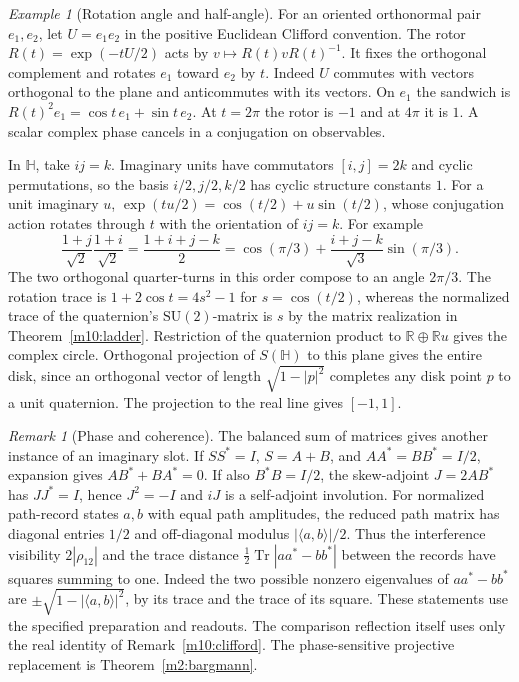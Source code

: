 \documentclass[11pt,reqno]{amsart}
\theoremstyle{definition}
\theoremstyle{remark}
\newtheorem{remark}[theorem]{Remark}
\newtheorem{example}[theorem]{Example}
\numberwithin{equation}{section}
\newcommand{\R}{\mathbb{R}}
\newcommand{\HH}{\mathbb{H}}
\newcommand{\SU}{\mathrm{SU}}
\begin{document}
\begin{example}[Rotation angle and half-angle]\label{m10:rotors}
For an oriented orthonormal pair \(e_1,e_2\), let \(U=e_1e_2\) in
the positive Euclidean Clifford convention. The rotor
\(R(t)=\exp(-tU/2)\) acts by \(v\mapsto R(t)vR(t)^{-1}\).
It fixes the orthogonal complement and rotates \(e_1\) toward
\(e_2\) by \(t\). Indeed \(U\) commutes with vectors orthogonal
to the plane and anticommutes with its vectors. On \(e_1\) the
sandwich is \(R(t)^2e_1=\cos t\, e_1+\sin t\,e_2\).
At \(t=2\pi\) the rotor is \(-1\) and at \(4\pi\) it is \(1\).
A scalar complex phase cancels in a conjugation on observables.

In \(\HH\), take \(ij=k\). Imaginary units have commutators
\([i,j]=2k\) and cyclic permutations, so the basis
\(i/2,j/2,k/2\) has cyclic structure constants \(1\). For a unit
imaginary \(u\), \(\exp(tu/2)=\cos(t/2)+u\sin(t/2)\), whose
conjugation action rotates through \(t\) with the orientation
of \(ij=k\). For example
\[
 \frac{1+j}{\sqrt2}\frac{1+i}{\sqrt2}
 =\frac{1+i+j-k}{2}
 =\cos(\pi/3)+\frac{i+j-k}{\sqrt3}\sin(\pi/3).
\]
The two orthogonal quarter-turns in this order compose to an
angle \(2\pi/3\). The rotation trace is \(1+2\cos t=4s^2-1\)
for \(s=\cos(t/2)\), whereas the normalized trace of the
quaternion's \(\SU(2)\)-matrix is \(s\) by the matrix
realization in Theorem~\ref{m10:ladder}. Restriction of the
quaternion product to \(\R\oplus\R u\) gives the complex circle.
Orthogonal projection of \(S(\HH)\) to this plane gives the
entire disk, since an orthogonal vector of length
\(\sqrt{1-|p|^2}\) completes any disk point \(p\) to a unit
quaternion. The projection to the real line gives \([-1,1]\).
\end{example}

\begin{remark}[Phase and coherence]\label{m10:phase}
The balanced sum of matrices gives another instance of an imaginary
slot. If \(SS^*=I\), \(S=A+B\), and \(AA^*=BB^*=I/2\), expansion
gives \(AB^*+BA^*=0\). If also \(B^*B=I/2\), the skew-adjoint
\(J=2AB^*\) has \(JJ^*=I\), hence \(J^2=-I\) and \(iJ\) is a
self-adjoint involution. For normalized path-record states \(a,b\)
with equal path amplitudes, the reduced path matrix has diagonal
entries \(1/2\) and off-diagonal modulus \(|\langle a,b\rangle|/2\).
Thus the interference visibility \(2|\rho_{12}|\) and the trace
distance \(\tfrac12\operatorname{Tr}|aa^*-bb^*|\) between the
records have squares summing to one. Indeed the two possible
nonzero eigenvalues of \(aa^*-bb^*\) are
\(\pm\sqrt{1-|\langle a,b\rangle|^2}\), by its trace and the trace
of its square. These statements use the specified
preparation and readouts. The comparison reflection itself uses
only the real identity of Remark~\ref{m10:clifford}.
The phase-sensitive projective replacement is
Theorem~\ref{m2:bargmann}.
\end{remark}
\end{document}
